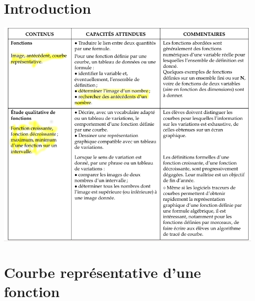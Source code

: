 
\section{Introduction}

\includegraphics[width=\linewidth]{BO_fonctions_graphique.png}

\section{Courbe représentative d'une fonction}

\begin{Aprojeter}
    
\end{Aprojeter}



